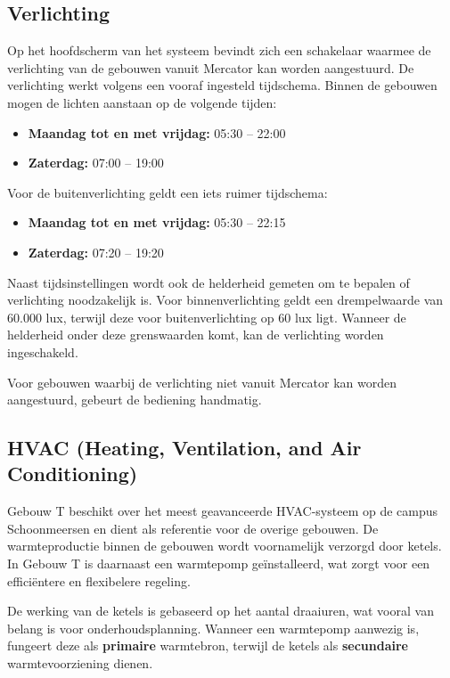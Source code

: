 \subsection{Verlichting}
Op het hoofdscherm van het systeem bevindt zich een schakelaar waarmee de verlichting van de gebouwen vanuit Mercator kan worden aangestuurd. De verlichting werkt volgens een vooraf ingesteld tijdschema. Binnen de gebouwen mogen de lichten aanstaan op de volgende tijden:

\begin{itemize}
    \item \textbf{Maandag tot en met vrijdag:} 05:30 -- 22:00
    \item \textbf{Zaterdag:} 07:00 -- 19:00
\end{itemize}

Voor de buitenverlichting geldt een iets ruimer tijdschema:

\begin{itemize}
    \item \textbf{Maandag tot en met vrijdag:} 05:30 -- 22:15
    \item \textbf{Zaterdag:} 07:20 -- 19:20
\end{itemize}

Naast tijdsinstellingen wordt ook de helderheid gemeten om te bepalen of verlichting noodzakelijk is. Voor binnenverlichting geldt een drempelwaarde van $60.000$ lux, terwijl deze voor buitenverlichting op $60$ lux ligt. Wanneer de helderheid onder deze grenswaarden komt, kan de verlichting worden ingeschakeld.

Voor gebouwen waarbij de verlichting niet vanuit Mercator kan worden aangestuurd, gebeurt de bediening handmatig.

\subsection{HVAC (Heating, Ventilation, and Air Conditioning)}
Gebouw T beschikt over het meest geavanceerde HVAC-systeem op de campus Schoonmeersen en dient als referentie voor de overige gebouwen. De warmteproductie binnen de gebouwen wordt voornamelijk verzorgd door ketels. In Gebouw T is daarnaast een warmtepomp geïnstalleerd, wat zorgt voor een efficiëntere en flexibelere regeling.

De werking van de ketels is gebaseerd op het aantal draaiuren, wat vooral van belang is voor onderhoudsplanning. Wanneer een warmtepomp aanwezig is, fungeert deze als \textbf{primaire} warmtebron, terwijl de ketels als \textbf{secundaire} warmtevoorziening dienen.

